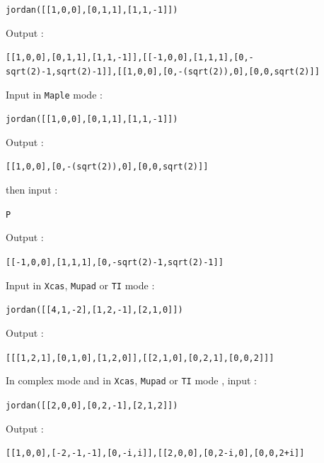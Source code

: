 \documentclass[a4paper,11pt]{book}
\begin{document}
\begin{center}{\tt jordan([[1,0,0],[0,1,1],[1,1,-1]])}\end{center}
Output :
\begin{center}{\tt [[1,0,0],[0,1,1],[1,1,-1]],[[-1,0,0],[1,1,1],[0,-sqrt(2)-1,sqrt(2)-1]],[[1,0,0],[0,-(sqrt(2)),0],[0,0,sqrt(2)]]}\end{center}
Input  in {\tt Maple} mode :
\begin{center}{\tt jordan([[1,0,0],[0,1,1],[1,1,-1]])}\end{center}
Output :
\begin{center}{\tt [[1,0,0],[0,-(sqrt(2)),0],[0,0,sqrt(2)]]}\end{center}
then input : 
\begin{center}{\tt P}\end{center}
Output :
\begin{center}{\tt [[-1,0,0],[1,1,1],[0,-sqrt(2)-1,sqrt(2)-1]]}\end{center}
Input  in {\tt Xcas}, {\tt Mupad} or {\tt TI} mode :
\begin{center}{\tt jordan([[4,1,-2],[1,2,-1],[2,1,0]])}\end{center}
Output :
\begin{center}{\tt  [[[1,2,1],[0,1,0],[1,2,0]],[[2,1,0],[0,2,1],[0,0,2]]]}\end{center}
In complex mode and in {\tt Xcas}, {\tt Mupad} or {\tt TI} mode , input :
\begin{center}{\tt jordan([[2,0,0],[0,2,-1],[2,1,2]])}\end{center}
Output :
\begin{center}{\tt [[1,0,0],[-2,-1,-1],[0,-i,i]],[[2,0,0],[0,2-i,0],[0,0,2+i]]}\end{center}
\end{document}
